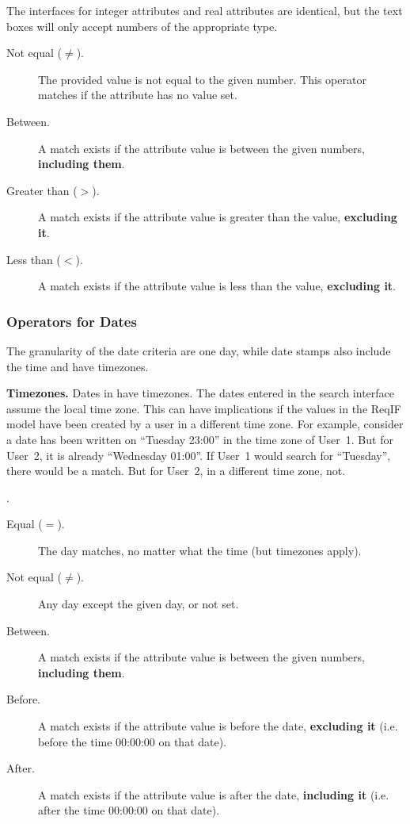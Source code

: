 The interfaces for integer attributes and real attributes are identical, but the text boxes will only accept numbers of the appropriate type.

\begin{description}
\item[Not equal ($\neq$).] The provided value is not equal to the given number. This operator matches if the attribute has no value set.
\item[Between.] A match exists if the attribute value is between the given numbers, \textbf{including them}.
\item[Greater than ($>$).] A match exists if the attribute value is greater than the value, \textbf{excluding it}.
\item[Less than ($<$).] A match exists if the attribute value is less than the value, \textbf{excluding it}.
\end{description}

\subsubsection{Operators for Dates}

The granularity of the date criteria are one day, while \pror{} date stamps also include the time and have timezones.

\begin{warning}
\textbf{Timezones.} Dates in \pror{} have timezones.  The dates entered in the search interface assume the local time zone.  This can have implications if the values in the ReqIF model have been created by a user in a different time zone.  For example, consider a date has been written on ``Tuesday 23:00'' in the time zone of User~1.  But for User~2, it is already ``Wednesday 01:00''.  If User~1 would search for ``Tuesday'', there would be a match.  But for User~2, in a different time zone, not.
\end{warning}.

\begin{description}
\item[Equal ($=$).] The day matches, no matter what the time (but timezones apply).
\item[Not equal ($\neq$).] Any day except the given day, or not set.
\item[Between.] A match exists if the attribute value is between the given numbers, \textbf{including them}.
\item[Before.] A match exists if the attribute value is before the date, \textbf{excluding it} (i.e. before the time 00:00:00 on that date).
\item[After.] A match exists if the attribute value is after the date, \textbf{including it} (i.e. after the time 00:00:00 on that date).
\end{description}

